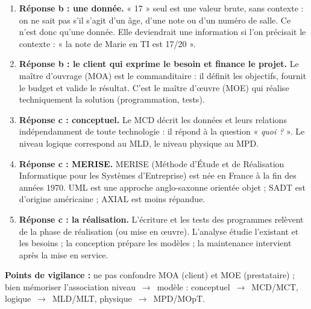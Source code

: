 \documentclass[11pt]{article}
\newcommand{\cle}[1]{{\popxbold\color{popdark}#1}}
\begin{document}
\begin{corrige}
\begin{enumerate}
  \item \textbf{Réponse b : une donnée.} « 17 » seul est une valeur brute, sans contexte : on ne sait pas s'il s'agit d'un âge, d'une note ou d'un numéro de salle. Ce n'est donc qu'une \cle{donnée}. Elle deviendrait une \cle{information} si l'on précisait le contexte : « la note de Marie en TI est 17/20 ».
  \item \textbf{Réponse b : le client qui exprime le besoin et finance le projet.} Le \cle{maître d'ouvrage} (MOA) est le commanditaire : il définit les objectifs, fournit le budget et valide le résultat. C'est le \cle{maître d'œuvre} (MOE) qui réalise techniquement la solution (programmation, tests).
  \item \textbf{Réponse c : conceptuel.} Le MCD décrit les données et leurs relations indépendamment de toute technologie : il répond à la question « \emph{quoi ?} ». Le niveau logique correspond au MLD, le niveau physique au MPD.
  \item \textbf{Réponse c : MERISE.} MERISE (Méthode d'Étude et de Réalisation Informatique pour les Systèmes d'Entreprise) est née en France à la fin des années 1970. UML est une approche anglo-saxonne orientée objet ; SADT est d'origine américaine ; AXIAL est moins répandue.
  \item \textbf{Réponse c : la réalisation.} L'écriture et les tests des programmes relèvent de la phase de \cle{réalisation} (ou mise en œuvre). L'analyse étudie l'existant et les besoins ; la conception prépare les modèles ; la maintenance intervient après la mise en service.
\end{enumerate}
\textbf{Points de vigilance :} ne pas confondre MOA (client) et MOE (prestataire) ; bien mémoriser l'association niveau~$\to$~modèle : conceptuel~$\to$~MCD/MCT, logique~$\to$~MLD/MLT, physique~$\to$~MPD/MOpT.
\end{corrige}
\end{document}

